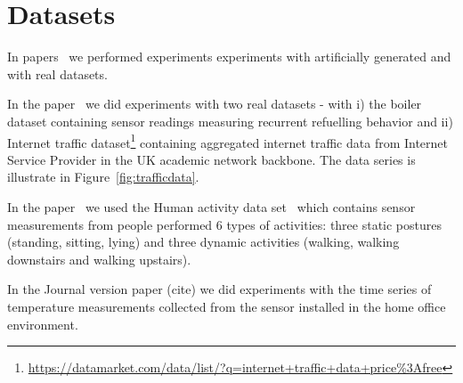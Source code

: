 \section{Datasets}

In papers~\cite{MaslovSDM2016, MaslovIJCNN2017} we performed experiments experiments with artificially generated and with real datasets.

In the paper~\cite{MaslovSDM2016} we did experiments with two real datasets - with i) the boiler dataset containing sensor readings measuring recurrent refuelling behavior and ii) Internet traffic dataset\footnote{\url{https://datamarket.com/data/list/?q=internet+traffic+data+price\%3Afree}} containing aggregated internet traffic data from Internet Service Provider in the UK academic network backbone. The data series is illustrate in Figure~\ref{fig:trafficdata}.

In the paper~\cite{MaslovIJCNN2017} we used the Human activity data set~\cite{reyes2016transition} which contains sensor measurements from people performed 6 types of activities: three static postures (standing, sitting, lying) and three dynamic activities (walking, walking downstairs and walking
upstairs).

In the Journal version paper (cite) we did experiments with the time series of temperature measurements collected from the sensor installed in the home office environment.


